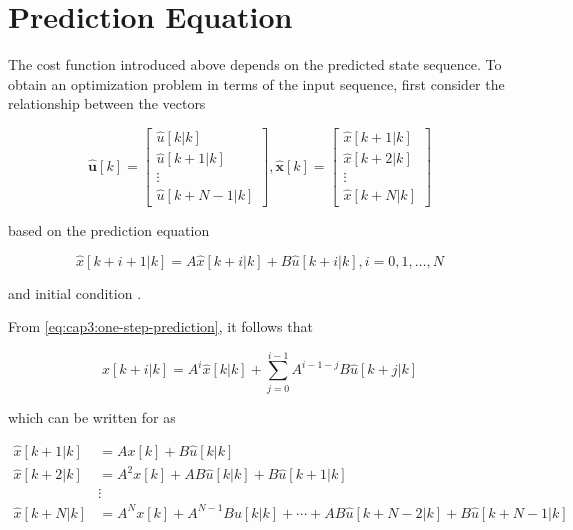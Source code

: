 \section{Prediction Equation}

The cost function introduced above depends on the predicted state sequence. To obtain an optimization problem in terms of the input sequence, first consider the relationship between the vectors

\begin{equation}
	\mathbf{\hat{u}}[k] = \left[
		\begin{matrix}
			\hat{u}[k | k] \\ 
			\hat{u}[k + 1 | k] \\ 
			\vdots \\ 
			\hat{u}[k + N-1 | k]
		\end{matrix}
	\right],
	\mathbf{\hat{x}}[k] = 
		\left[
		\begin{matrix}
			\hat{x}[k + 1 | k] \\ 
			\hat{x}[k + 2 | k] \\ 
			\vdots \\ 
			\hat{x}[k + N | k]
		\end{matrix}
	\right]
\end{equation}

\noindent
based on the prediction equation

\noindent
\begin{equation}
	\label{eq:cap3:one-step-prediction}
	\hat{x}[k + i +1|k] = A\hat{x}[k+i|k] + B \hat{u}[k+i|k], 
	i = 0, 1, \ldots, N 
\end{equation}

\noindent
and initial condition .

From \eqref{eq:cap3:one-step-prediction}, it follows that

\begin{equation}
	\hat{x}[k+i|k] = A^i\hat{x}[k|k] + \sum_{j=0}^{i-1} A^{i - 1 -j} B \hat{u}[k+j|k]
\end{equation}

\noindent
which can be written for  as

\noindent
\begin{align}
	\hat{x}[k+1|k] &= A x[k] +  B \hat{u}[k|k] \\
	\hat{x}[k+2|k] &= A^2 x[k] + A B \hat{u}[k|k] +  B \hat{u}[k+1|k] \\
	&\vdots \\
	\hat{x}[k+N|k] &= A^N x[k] + A^{N - 1} B \hat{u}[k|k] + \cdots + A B \hat{u}[k +N - 2|k] +  B \hat{u}[k + N - 1|k]
\end{align}

